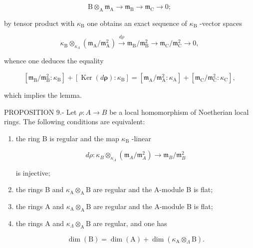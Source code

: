 \[
\mathrm{B} \otimes_ {\mathrm{A}} \mathfrak {m} _ {\mathrm{A}} \longrightarrow \mathfrak {m} _ {\mathrm{B}} \longrightarrow \mathfrak {m} _ {\mathrm{C}} \rightarrow 0;
\]

by tensor product with \(\kappa_{\mathrm{B}}\) one obtains an exact sequence of \(\kappa_{\mathrm{B}}\) -vector spaces

\[
\kappa_ {\mathrm{B}} \otimes_ {\kappa_ {\Lambda}} (\mathfrak {m} _ {\mathrm{A}} / \mathfrak {m} _ {\mathrm{A}} ^ {2}) \stackrel {d \rho} {\longrightarrow} \mathfrak {m} _ {\mathrm{B}} / \mathfrak {m} _ {\mathrm{B}} ^ {2} \longrightarrow \mathfrak {m} _ {\mathrm{C}} / \mathfrak {m} _ {\mathrm{C}} ^ {2} \rightarrow 0,
\]

whence one deduces the equality

\[
\left[ \mathfrak {m} _ {\mathrm{B}} / \mathfrak {m} _ {\mathrm{B}} ^ {2}: \kappa_ {\mathrm{B}} \right] + \left[ \operatorname{Ker} (d \boldsymbol {\rho}): \kappa_ {\mathrm{B}} \right] = \left[ \mathfrak {m} _ {\mathrm{A}} / \mathfrak {m} _ {\mathrm{A}} ^ {2}: \kappa_ {\mathrm{A}} \right] + \left[ \mathfrak {m} _ {\mathrm{C}} / \mathfrak {m} _ {\mathrm{C}} ^ {2}: \kappa_ {\mathrm{C}} \right],
\]

which implies the lemma.

PROPOSITION 9.- Let \(\rho : A \to B\) be a local homomorphism of Noetherian local rings. The following conditions are equivalent:

\begin{enumerate}
\def\labelenumi{(\roman{enumi})}
\tightlist
\item
  the ring B is regular and the map \(\kappa_{\mathrm{B}}\) -linear

\[
d \rho : \kappa_ {B} \otimes_ {\kappa_ {A}} \left(\mathfrak {m} _ {A} / \mathfrak {m} _ {A} ^ {2}\right) \longrightarrow \mathfrak {m} _ {B} / \mathfrak {m} _ {B} ^ {2}
\]

is injective;

\item
  the rings B and \(\kappa_{\mathrm{A}}\otimes_{\mathrm{A}}\mathrm{B}\) are regular and the A-module B is flat;
\item
  the rings A and \(\kappa_{\mathrm{A}}\otimes_{\mathrm{A}}\mathrm{B}\) are regular and the A-module B is flat;
\item
  the rings A and \(\kappa_{\Lambda} \otimes_{\mathrm{A}} \mathrm{B}\) are regular, and one has

\[
\dim (\mathrm{B}) = \dim (\mathrm{A}) + \dim (\kappa_ {\mathrm{A}} \otimes_ {\Lambda} \mathrm{B}).
\]
\end{enumerate}

